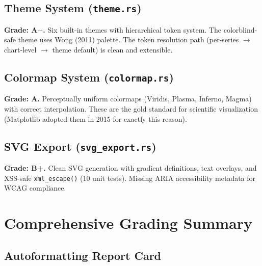 \documentclass[11pt,a4paper]{article}
\begin{document}
\subsection{Theme System (\texttt{theme.rs})}

\begin{strengthbox}
\textbf{Grade: A$-$.}
Six built-in themes with hierarchical token system. The colorblind-safe
theme uses Wong (2011) palette. The token resolution path
(per-series $\to$ chart-level $\to$ theme default) is clean and extensible.
\end{strengthbox}

\subsection{Colormap System (\texttt{colormap.rs})}

\begin{strengthbox}
\textbf{Grade: A.}
Perceptually uniform colormaps (Viridis, Plasma, Inferno, Magma) with
correct interpolation. These are the gold standard for scientific
visualization (Matplotlib adopted them in 2015 for exactly this reason).
\end{strengthbox}

\subsection{SVG Export (\texttt{svg\_export.rs})}

\begin{strengthbox}
\textbf{Grade: B+.}
Clean SVG generation with gradient definitions, text overlays, and
XSS-safe \texttt{xml\_escape()} (10 unit tests). Missing ARIA accessibility
metadata for WCAG compliance.
\end{strengthbox}

\section{Comprehensive Grading Summary}

\subsection{Autoformatting Report Card}
\end{document}
